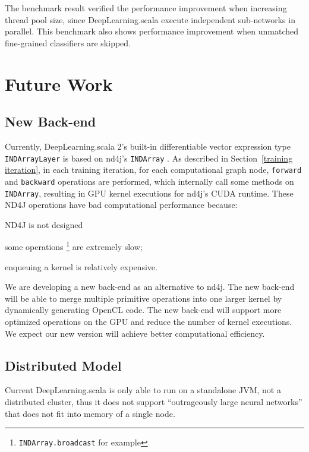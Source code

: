 The benchmark result verified the performance improvement when increasing thread pool size, since DeepLearning.scala execute independent sub-networks in parallel. This benchmark also shows performance improvement when unmatched fine-grained classifiers are skipped.

\section{Future Work}

\subsection{New Back-end}\label{New Back-end}
Currently, DeepLearning.scala 2's built-in differentiable vector expression type \lstinline{INDArrayLayer} is based on nd4j's \lstinline{INDArray} \cite{skymind2017nd4j}.
As described in Section~\ref{training iteration}, in each training iteration, for each \gls{computational graph} node, \lstinline{forward} and \lstinline{backward} operations are performed, which internally call some methods on \lstinline{INDArray}, resulting in GPU kernel executions for nd4j's CUDA runtime. These ND4J operations have bad computational performance because:
\begin{enumerate*}
  \item ND4J is not designed
  \item some operations \footnote{\lstinline{INDArray.broadcast} for example} are extremely slow;
  \item enqueuing a kernel is relatively expensive.
\end{enumerate*}

 We are developing a new back-end as an alternative to nd4j. The new back-end will be able to merge multiple primitive operations into one larger kernel by dynamically generating OpenCL code. The new back-end
 will support more optimized operations on the GPU and reduce the number of kernel executions. We expect our new version will achieve better computational efficiency.

\subsection{Distributed Model}

Current DeepLearning.scala is only able to run on a standalone JVM, not a distributed cluster, thus it does not support ``outrageously large neural networks'' \cite{shazeer2017outrageously} that does not fit into memory of a single node.

